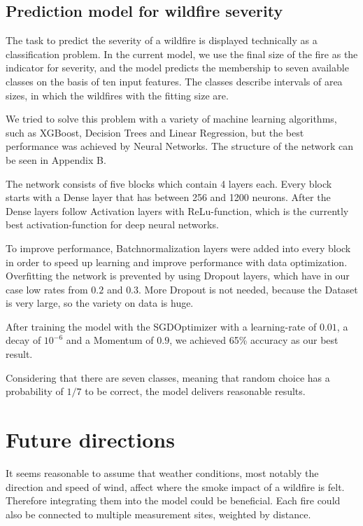 \documentclass[a4paper,12pt]{article}
\begin{document}
\subsection{Prediction model for wildfire severity}

The task to predict the severity of a wildfire is displayed technically as a classification problem. In the current model, we use the final size of the fire as the indicator for severity, and the model predicts the membership to seven available classes on the basis of ten input features. The classes describe intervals of area sizes, in which the wildfires with the fitting size are.

We tried to solve this problem with a variety of machine learning algorithms, such as XGBoost, Decision Trees and Linear Regression, but the best performance was achieved by Neural Networks. The structure of the network can be seen in Appendix B.

The network consists of five blocks which contain 4 layers each. Every block starts with a Dense layer that has between 256 and 1200 neurons. After the Dense layers follow Activation layers with ReLu-function, which is the currently best activation-function for deep neural networks.

To improve performance, Batchnormalization layers were added into every block in order to speed up learning and improve performance with data optimization. Overfitting the network is prevented by using Dropout layers, which have in our case low rates from $0.2$ and $0.3$. More Dropout is not needed, because the Dataset is very large, so the variety on data is huge.

After training the model with the SGDOptimizer with a learning-rate of $0.01$, a decay of $10^{-6}$ and a Momentum of $0.9$, we achieved 65\% accuracy as our best result.

Considering that there are seven classes, meaning that random choice has a probability of $1/7$ to be correct, the model delivers reasonable results.

\section{Future directions}

It seems reasonable to assume that weather conditions, most notably the direction and speed of wind, affect where the smoke impact of a wildfire is felt. Therefore integrating them into the model could be beneficial. Each fire could also be connected to multiple measurement sites, weighted by distance.
\end{document}
